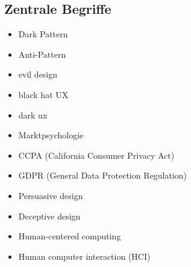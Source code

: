\documentclass[conference,compsoc,final,a4paper]{IEEEtran}
\begin{document}
\subsection{Zentrale Begriffe}
\begin{itemize}
\item Dark Pattern
\item Anti-Pattern
\item evil design
\item black hat UX
\item dark ux
\item Marktpsychologie
\item CCPA (California Consumer Privacy Act)
\item GDPR (General Data Protection Regulation)
\item Persuasive design
\item Deceptive design
\item Human-centered computing
\item Human computer interaction (HCI)
\end{itemize}
\end{document}
